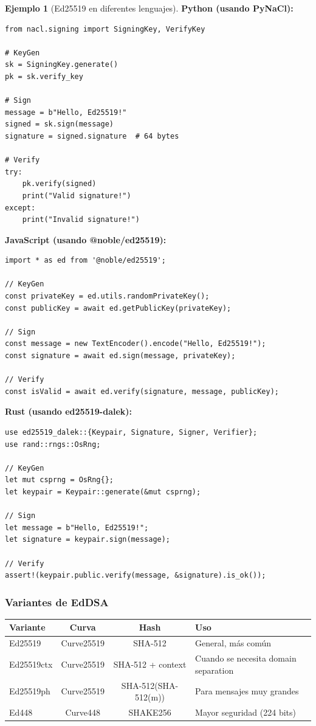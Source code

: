 \documentclass[11pt,a4paper,twoside,openright]{book}
\theoremstyle{definition}
\newtheorem{example}{Ejemplo}[chapter]
\theoremstyle{plain}
\theoremstyle{remark}
\begin{document}
\begin{example}[Ed25519 en diferentes lenguajes]
\textbf{Python (usando PyNaCl):}
\begin{verbatim}
from nacl.signing import SigningKey, VerifyKey

# KeyGen
sk = SigningKey.generate()
pk = sk.verify_key

# Sign
message = b"Hello, Ed25519!"
signed = sk.sign(message)
signature = signed.signature  # 64 bytes

# Verify
try:
    pk.verify(signed)
    print("Valid signature!")
except:
    print("Invalid signature!")
\end{verbatim}

\textbf{JavaScript (usando @noble/ed25519):}
\begin{verbatim}
import * as ed from '@noble/ed25519';

// KeyGen
const privateKey = ed.utils.randomPrivateKey();
const publicKey = await ed.getPublicKey(privateKey);

// Sign
const message = new TextEncoder().encode("Hello, Ed25519!");
const signature = await ed.sign(message, privateKey);

// Verify
const isValid = await ed.verify(signature, message, publicKey);
\end{verbatim}

\textbf{Rust (usando ed25519-dalek):}
\begin{verbatim}
use ed25519_dalek::{Keypair, Signature, Signer, Verifier};
use rand::rngs::OsRng;

// KeyGen
let mut csprng = OsRng{};
let keypair = Keypair::generate(&mut csprng);

// Sign
let message = b"Hello, Ed25519!";
let signature = keypair.sign(message);

// Verify
assert!(keypair.public.verify(message, &signature).is_ok());
\end{verbatim}
\end{example}

\subsubsection{Variantes de EdDSA}

\begin{center}
\begin{tabular}{lccl}
\toprule
\textbf{Variante} & \textbf{Curva} & \textbf{Hash} & \textbf{Uso} \\
\midrule
Ed25519 & Curve25519 & SHA-512 & General, más común \\
Ed25519ctx & Curve25519 & SHA-512 + context & Cuando se necesita domain separation \\
Ed25519ph & Curve25519 & SHA-512(SHA-512(m)) & Para mensajes muy grandes \\
Ed448 & Curve448 & SHAKE256 & Mayor seguridad (224 bits) \\
\bottomrule
\end{tabular}
\end{center}
\end{document}
